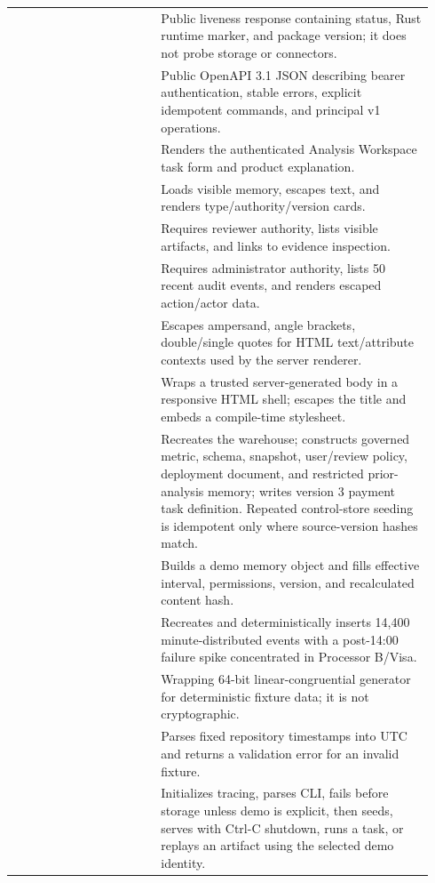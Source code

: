 \begin{longtable}{L{0.33\linewidth}L{0.61\linewidth}}
 & Public liveness response containing status, Rust runtime marker, and package version; it does not probe storage or connectors. \\
 & Public OpenAPI 3.1 JSON describing bearer authentication, stable errors, explicit idempotent commands, and principal v1 operations. \\
 & Renders the authenticated Analysis Workspace task form and product explanation. \\
 & Loads visible memory, escapes text, and renders type/authority/version cards. \\
 & Requires reviewer authority, lists visible artifacts, and links to evidence inspection. \\
 & Requires administrator authority, lists 50 recent audit events, and renders escaped action/actor data. \\
 & Escapes ampersand, angle brackets, double/single quotes for HTML text/attribute contexts used by the server renderer. \\
 & Wraps a trusted server-generated body in a responsive HTML shell; escapes the title and embeds a compile-time stylesheet. \\
 & Recreates the warehouse; constructs governed metric, schema, snapshot, user/review policy, deployment document, and restricted prior-analysis memory; writes version 3 payment task definition. Repeated control-store seeding is idempotent only where source-version hashes match. \\
 & Builds a demo memory object and fills effective interval, permissions, version, and recalculated content hash. \\
 & Recreates  and deterministically inserts 14,400 minute-distributed events with a post-14:00 failure spike concentrated in Processor B/Visa. \\
 & Wrapping 64-bit linear-congruential generator for deterministic fixture data; it is not cryptographic. \\
 & Parses fixed repository timestamps into UTC and returns a validation error for an invalid fixture. \\
 & Initializes tracing, parses CLI, fails before storage unless demo is explicit, then seeds, serves with Ctrl-C shutdown, runs a task, or replays an artifact using the selected demo identity. \\
\bottomrule
\end{longtable}

